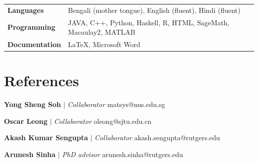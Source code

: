 \begin{tabular*}{\textwidth}{l @{\hskip 0.5in} l}
\textbf{Languages} & Bengali (mother tongue), English (fluent), Hindi (fluent)\\
\textbf{Programming}  & {JAVA, C++, Python, Haskell, R, HTML, SageMath, Macaulay2,  MATLAB} \\
\textbf {Documentation} & {\LaTeX, Microsoft Word} \\
\end{tabular*}

\section{References}
\resumeSubHeadingListStart

\resumeProjectHeading
{\textbf{Yong Sheng Soh} $|$ \textit{Collaborator}}
{matsys@nus.edu.sg}
{\resumeItemListStart
{}
\resumeItemListEnd}
\vspace{\gap}

\resumeProjectHeading
{\textbf{Oscar Leong} $|$ \textit{Collaborator}}
{oleong@sjtu.edu.cn}
{\resumeItemListStart
{}
\resumeItemListEnd}
\vspace{\gap}

\resumeProjectHeading
{\textbf{Akash Kumar Sengupta} $|$ \textit{Collaborator}}
{akash.sengupta@rutgers.edu}
{\resumeItemListStart
{}
\resumeItemListEnd}
\vspace{\gap}

\resumeProjectHeading
{\textbf{Arunesh Sinha} $|$ \textit{PhD advisor}}
{arunesh.sinha@rutgers.edu}
{\resumeItemListStart
{}
\resumeItemListEnd}
\vspace{\gap}

